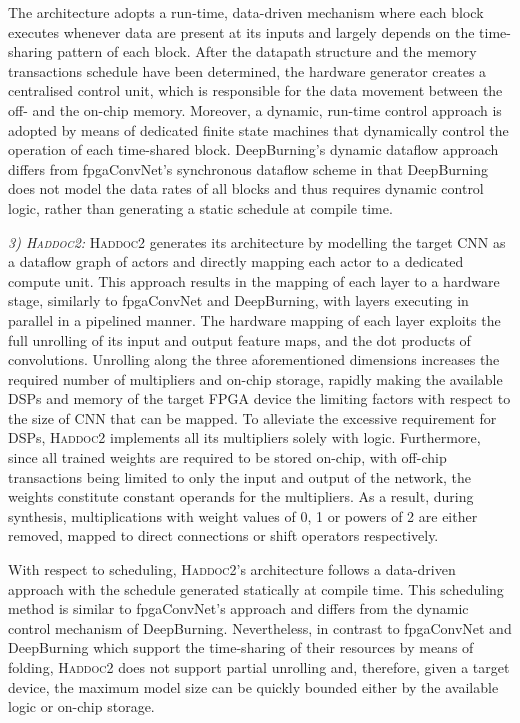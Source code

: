 \documentclass[format=acmsmall, review=false, screen=true]{acmart}
\begin{document}
The architecture adopts a run-time, data-driven mechanism where each block executes whenever data are present at its inputs and largely depends on the time-sharing pattern of each block. After the datapath structure and the memory transactions schedule have been determined, the hardware generator creates a centralised control unit, which is responsible for the data movement between the off- and the on-chip memory. Moreover, a dynamic, run-time control approach is adopted by means of dedicated finite state machines that dynamically control the operation of each time-shared block. DeepBurning's dynamic dataflow approach differs from fpgaConvNet's synchronous dataflow scheme in that DeepBurning does not model the data rates of all blocks and thus requires dynamic control logic, rather than generating a static schedule at compile time.

{\color{black}\textit{3) \textsc{Haddoc2}:} \textsc{Haddoc2} generates its architecture by modelling the target CNN as a dataflow graph of actors and directly mapping each actor to a dedicated compute unit. This approach results in the mapping of each layer to a hardware stage, similarly to fpgaConvNet and DeepBurning, with layers executing in parallel in a pipelined manner. The hardware mapping of each layer exploits the full unrolling of its input and output feature maps, and the dot products of convolutions. Unrolling along the three aforementioned dimensions increases the required number of multipliers and on-chip storage, rapidly making the available DSPs and memory of the target FPGA device the limiting factors with respect to the size of CNN that can be mapped. To alleviate the excessive requirement for DSPs, \textsc{Haddoc2} implements all its multipliers solely with logic. Furthermore, since all trained weights are required to be stored on-chip, with off-chip transactions being limited to only the input and output of the network, the weights constitute constant operands for the multipliers. As a result, during synthesis, multiplications with weight values of 0, 1 or powers of 2 are either removed, mapped to direct connections or shift operators respectively. 

With respect to scheduling, \textsc{Haddoc2}'s architecture follows a data-driven approach with the schedule generated statically at compile time. This scheduling method is similar to fpgaConvNet's approach and differs from the dynamic control mechanism of DeepBurning. Nevertheless, in contrast to fpgaConvNet and DeepBurning which support the time-sharing of their resources by means of folding, \textsc{Haddoc2} does not support partial unrolling and, therefore, given a target device, the maximum model size can be quickly bounded either by the available logic or on-chip storage.


}
\end{document}
